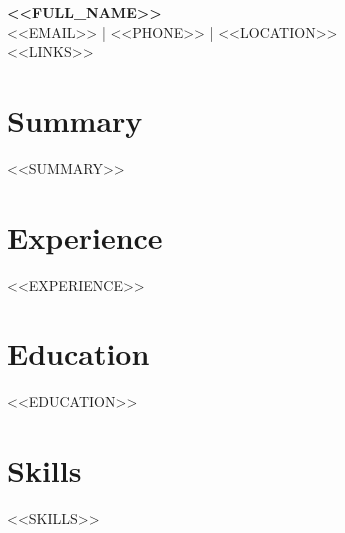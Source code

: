 \documentclass[11pt,letterpaper]{article}
\begin{document}
\begin{center}
{\Large \textbf{<<FULL_NAME>>}}\\
<<EMAIL>> \quad | \quad <<PHONE>> \quad | \quad <<LOCATION>>\\
<<LINKS>>
\end{center}

\vspace{8pt}
\section*{Summary}
<<SUMMARY>>

\section*{Experience}
<<EXPERIENCE>>

\section*{Education}
<<EDUCATION>>

\section*{Skills}
<<SKILLS>>
\end{document}

